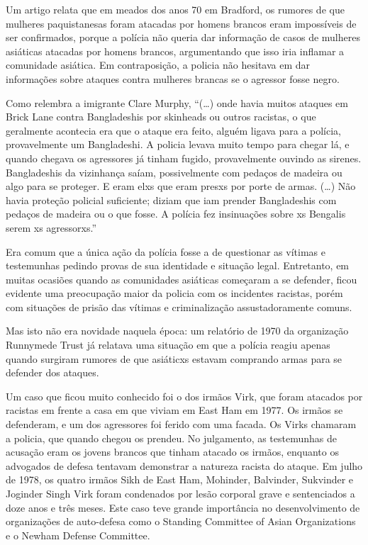 Um artigo relata que em meados dos anos 70 em Bradford, os rumores de que mulheres paquistanesas foram atacadas por homens brancos eram impossíveis de ser confirmados, porque a polícia não queria dar informação de casos de mulheres asiáticas atacadas por homens brancos, argumentando que isso iria inflamar a comunidade asiática. Em contraposição, a policia não hesitava em dar informações sobre ataques contra mulheres brancas se o agressor fosse negro.


Como relembra a imigrante Clare Murphy, “(…) onde havia muitos ataques em Brick Lane contra Bangladeshis por skinheads ou outros racistas, o que geralmente acontecia era que o ataque era feito, alguém ligava para a polícia, provavelmente um Bangladeshi. A policia levava muito tempo para chegar lá, e quando chegava os agressores já tinham fugido, provavelmente ouvindo as sirenes. Bangladeshis da vizinhança saíam, possivelmente com pedaços de madeira ou algo para se proteger. E eram elxs que eram presxs por porte de armas. (…) Não havia proteção policial suficiente; diziam que iam prender Bangladeshis com pedaços de madeira ou o que fosse. A polícia fez insinuações sobre xs Bengalis serem xs agressorxs.”

Era comum que a única ação da polícia fosse a de questionar as vítimas e testemunhas pedindo provas de sua identidade e situação legal. Entretanto, em muitas ocasiões quando as comunidades asiáticas começaram a se defender, ficou evidente uma preocupação maior da policia com os incidentes racistas, porém com situações de prisão das vítimas e criminalização assustadoramente comuns.

 

Mas isto não era novidade naquela época: um relatório de 1970 da organização Runnymede Trust já relatava uma situação em que a polícia reagiu apenas quando surgiram rumores de que asiáticxs estavam comprando armas para se defender dos ataques.

Um caso que ficou muito conhecido foi o dos irmãos Virk, que foram atacados por racistas em frente a casa em que viviam em East Ham em 1977. Os irmãos se defenderam, e um dos agressores foi ferido com uma facada. Os Virks chamaram a policia, que quando chegou os prendeu. No julgamento, as testemunhas de acusação eram os jovens brancos que tinham atacado os irmãos, enquanto os advogados de defesa tentavam demonstrar a natureza racista do ataque. Em julho de 1978, os quatro irmãos Sikh de East Ham, Mohinder, Balvinder, Sukvinder e Joginder Singh Virk foram condenados por lesão corporal grave e sentenciados a doze anos e três meses. Este caso teve grande importância no desenvolvimento de organizações de auto-defesa como o Standing Committee of Asian Organizations e o Newham Defense Committee.



